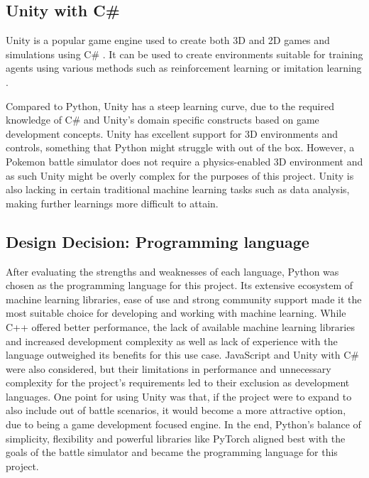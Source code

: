 \subsection{Unity with C\#}
Unity is a popular game engine used to create both 3D and 2D games and simulations using C\# \cite{Unity}. It can be used to create environments suitable
for training agents using various methods such as reinforcement learning or imitation learning \cite{UnityMLAgents}. 

Compared to Python, Unity has a steep learning curve,
due to the required knowledge of C\# and Unity's domain specific constructs based on game development concepts. Unity has excellent support for 3D environments and controls,
something that Python might struggle with out of the box. However, a Pokemon battle simulator does not require a physics-enabled 3D environment and as such
Unity might be overly complex for the purposes of this project.
Unity is also lacking in certain traditional machine learning tasks such as data analysis, making further learnings more difficult to attain.  

\subsection{Design Decision: Programming language}
After evaluating the strengths and weaknesses of each language, Python was chosen as the programming language for this project. 
Its extensive ecosystem of machine learning libraries, ease of use and strong community support made it the most suitable choice for developing
and working with machine learning. While C++ offered better performance, the lack of available machine learning libraries and
increased development complexity as well as lack of experience with the language outweighed its benefits for this use case. JavaScript and 
Unity with C\# were also considered, but their limitations in performance and unnecessary complexity for the project's requirements led to 
their exclusion as development languages. One point for using Unity was that, if the project were to expand to also include out of battle scenarios, it 
would become a more attractive option, due to being a game development focused engine.
In the end, Python's balance of simplicity, flexibility and powerful libraries like PyTorch aligned best with the goals of the battle simulator and became the 
programming language for this project.
